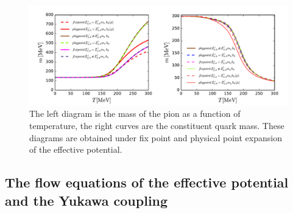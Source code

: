 \documentclass[%
reprint,
superscriptaddress,
showpacs,preprintnumbers,
 amsmath,amssymb,
 aps,
prd,
]{revtex4-1}
\begin{document}
\begin{figure}[t]
\label{fig:m}
\includegraphics[width=1.0\textwidth]{m.pdf}
\caption{The left diagram is the mass of the pion as a function of temperature, the right curves are the constituent quark mass. 
These diagrams are obtained under fix point and physical point expansion of the effective potential.}
\end{figure}







\subsection{The flow equations of the effective potential and the Yukawa coupling}
\end{document}
